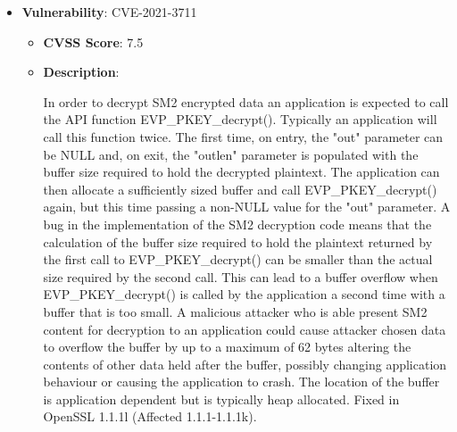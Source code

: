 \documentclass{article}
\begin{document}
\begin{itemize}
        \item \textbf{Vulnerability}: CVE-2021-3711
        \begin{itemize}
            \item \textbf{CVSS Score}:  7.5 
            \item \textbf{Description}:
            \parbox[t]{0.9\linewidth}{
                \ttfamily In order to decrypt SM2 encrypted data an application is expected to call the API function EVP\_PKEY\_decrypt(). Typically an application will call this function twice. The first time, on entry, the "out" parameter can be NULL and, on exit, the "outlen" parameter is populated with the buffer size required to hold the decrypted plaintext. The application can then allocate a sufficiently sized buffer and call EVP\_PKEY\_decrypt() again, but this time passing a non-NULL value for the "out" parameter. A bug in the implementation of the SM2 decryption code means that the calculation of the buffer size required to hold the plaintext returned by the first call to EVP\_PKEY\_decrypt() can be smaller than the actual size required by the second call. This can lead to a buffer overflow when EVP\_PKEY\_decrypt() is called by the application a second time with a buffer that is too small. A malicious attacker who is able present SM2 content for decryption to an application could cause attacker chosen data to overflow the buffer by up to a maximum of 62 bytes altering the contents of other data held after the buffer, possibly changing application behaviour or causing the application to crash. The location of the buffer is application dependent but is typically heap allocated. Fixed in OpenSSL 1.1.1l (Affected 1.1.1-1.1.1k).
            }
        \end{itemize}
    

\end{itemize}
\end{document}
